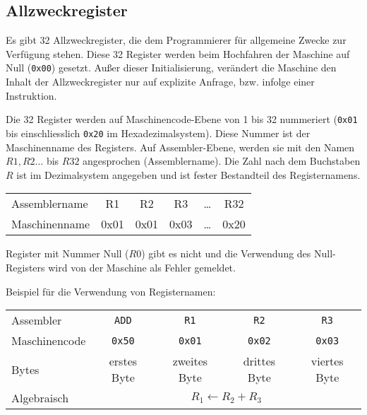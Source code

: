 \subsection{Allzweckregister}
Es gibt 32 Allzweckregister, die dem Programmierer für allgemeine Zwecke zur
Verfügung stehen.
Diese 32 Register werden beim Hochfahren der Maschine auf Null (\texttt{0x00})
gesetzt. Außer dieser Initialisierung, verändert die Maschine den Inhalt der
Allzweckregister nur auf explizite Anfrage, bzw. infolge einer Instruktion. 

Die 32 Register werden auf Maschinencode-Ebene von 1 bis 32 nummeriert
(\texttt{0x01} bis einschliesslich \texttt{0x20} im Hexadezimalsystem).
Diese Nummer ist der Maschinenname des Registers.
Auf Assembler-Ebene, werden sie mit den Namen $R1, R2\dots$ bis $R32$
angesprochen (Assemblername).
Die Zahl nach dem Buchstaben $R$ ist im Dezimalsystem angegeben
und ist fester Bestandteil des Registernamens.

\begin{center}
  \begin{tabular}{l||*{5}{T|}}
    Assemblername & R1   & R2   & R3   & \dots & R32 \\
    Maschinenname & 0x01 & 0x01 & 0x03 & \dots & 0x20
  \end{tabular}
\end{center}

Register mit Nummer Null ($R0$) gibt es nicht und die Verwendung des
Null-Registers wird von der Maschine als Fehler gemeldet.

Beispiel für die Verwendung von Registernamen:
\begin{center}
  \begin{tabular}{|l||*{4}{c|}}                                       \hline
    Assembler     & \texttt{ADD}  & \texttt{R1}   & \texttt{R2}   &
                    \texttt{R3}                                      \\
    Maschinencode & \texttt{0x50} & \texttt{0x01} & \texttt{0x02} &
                    \texttt{0x03}                                    \\\hline
    Bytes         & erstes Byte   & zweites Byte  & drittes Byte  & 
                    viertes Byte                                     \\\hline
    Algebraisch   & \multicolumn{4}{c|}{$R_{1} \gets R_{2} + R_{3}$} \\\hline
  \end{tabular}
\end{center}


